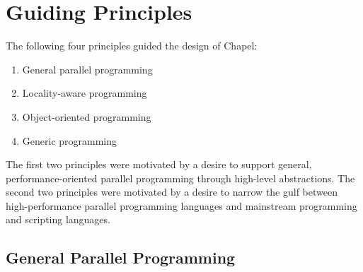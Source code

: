 \documentclass[letterpaper]{article}
\begin{document}
\section{Guiding Principles}

The following four principles guided the design of Chapel:
\begin{enumerate}
\item General parallel programming
\item Locality-aware programming
\item Object-oriented programming
\item Generic programming
\end{enumerate}

The first two principles were motivated by a desire to support general, performance-oriented parallel programming through high-level abstractions. The second two principles were motivated by a desire to narrow the gulf between high-performance parallel programming languages and mainstream programming and scripting languages.


\subsection{General Parallel Programming}
\end{document}
